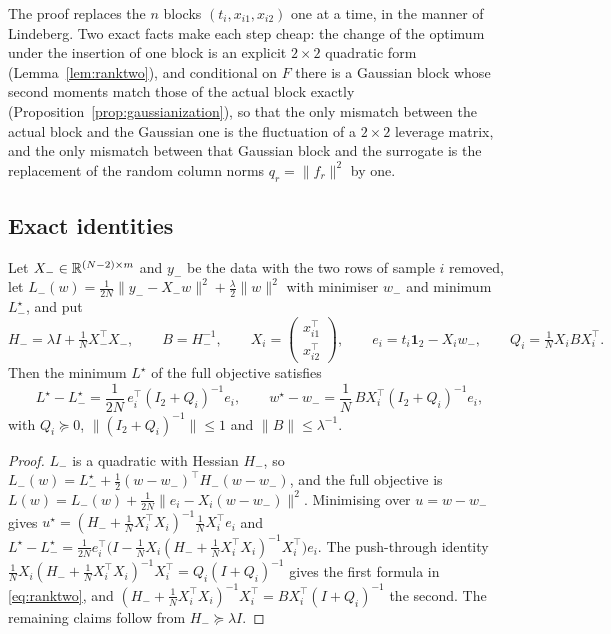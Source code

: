 The proof replaces the $n$ blocks $(t_i,x_{i1},x_{i2})$ one at a time, in the manner of Lindeberg. Two exact
facts make each step cheap: the change of the optimum under the insertion of one block is an explicit
$2\times2$ quadratic form (Lemma~\ref{lem:ranktwo}), and conditional on $F$ there is a Gaussian block whose
second moments match those of the actual block exactly (Proposition~\ref{prop:gaussianization}), so that
the only mismatch between the actual block and the Gaussian one is the fluctuation of a $2\times2$ leverage
matrix, and the only mismatch between that Gaussian block and the surrogate is the replacement of the
random column norms $q_r=\|f_r\|^2$ by one.

\subsection{Exact identities}

\begin{lemma}\label{lem:ranktwo}
Let $X_-\in\mathbb{R}^{(N-2)\times m}$ and $y_-$ be the data with the two rows of sample $i$ removed, let
$L_-(w)=\frac1{2N}\|y_--X_-w\|^2+\frac\lambda2\|w\|^2$ with minimiser $w_-$ and minimum $L_-^\star$, and put
\[
H_-=\lambda I+\tfrac1NX_-^\top X_-,\qquad B=H_-^{-1},\qquad
X_i=\begin{pmatrix}x_{i1}^\top\\x_{i2}^\top\end{pmatrix},\qquad e_i=t_i\mathbf 1_2-X_iw_-,\qquad
Q_i=\tfrac1NX_iBX_i^\top .
\]
Then the minimum $L^\star$ of the full objective satisfies
\begin{equation}
L^\star-L_-^\star=\frac1{2N}\,e_i^\top(I_2+Q_i)^{-1}e_i,\qquad
w^\star-w_-=\frac1N\,BX_i^\top(I_2+Q_i)^{-1}e_i,
\label{eq:ranktwo}
\end{equation}
with $Q_i\succeq0$, $\|(I_2+Q_i)^{-1}\|\le1$ and $\|B\|\le\lambda^{-1}$.
\end{lemma}

\begin{proof}
$L_-$ is a quadratic with Hessian $H_-$, so $L_-(w)=L_-^\star+\frac12(w-w_-)^\top H_-(w-w_-)$, and the full
objective is $L(w)=L_-(w)+\frac1{2N}\|e_i-X_i(w-w_-)\|^2$. Minimising over $u=w-w_-$ gives
$u^\star=(H_-+\frac1NX_i^\top X_i)^{-1}\frac1NX_i^\top e_i$ and
$L^\star-L_-^\star=\frac1{2N}e_i^\top\big(I-\frac1NX_i(H_-+\frac1NX_i^\top X_i)^{-1}X_i^\top\big)e_i$. The
push-through identity $\frac1NX_i(H_-+\frac1NX_i^\top X_i)^{-1}X_i^\top=Q_i(I+Q_i)^{-1}$ gives the first
formula in \eqref{eq:ranktwo}, and $(H_-+\frac1NX_i^\top X_i)^{-1}X_i^\top=BX_i^\top(I+Q_i)^{-1}$ the second.
The remaining claims follow from $H_-\succeq\lambda I$.
\end{proof}

